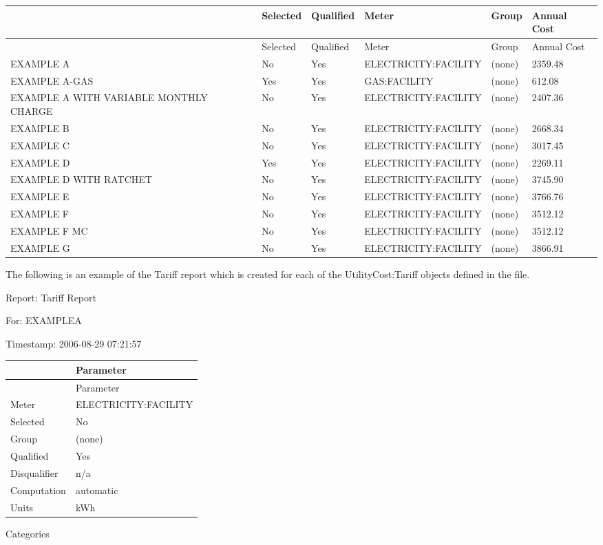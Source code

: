 {\scriptsize
\begin{longtable}[c]{>{\raggedright}p{1.0in}>{\raggedright}p{1.0in}>{\raggedright}p{1.0in}>{\raggedright}p{1.0in}>{\raggedright}p{1.0in}>{\raggedright}p{1.0in}}
\toprule 
~ & Selected & Qualified & Meter & Group & Annual Cost \tabularnewline
\midrule
\endfirsthead

\toprule 
~ & Selected & Qualified & Meter & Group & Annual Cost \tabularnewline
\midrule
\endhead

EXAMPLE A & No & Yes & ELECTRICITY\-:FACILITY & (none) & 2359.48 \tabularnewline
EXAMPLE A-GAS & Yes & Yes & GAS\-:FACILITY & (none) & 612.08 \tabularnewline
EXAMPLE A WITH VARIABLE MONTHLY CHARGE & No & Yes & ELECTRICITY\-:FACILITY & (none) & 2407.36 \tabularnewline
EXAMPLE B & No & Yes & ELECTRICITY\-:FACILITY & (none) & 2668.34 \tabularnewline
EXAMPLE C & No & Yes & ELECTRICITY\-:FACILITY & (none) & 3017.45 \tabularnewline
EXAMPLE D & Yes & Yes & ELECTRICITY\-:FACILITY & (none) & 2269.11 \tabularnewline
EXAMPLE D WITH RATCHET & No & Yes & ELECTRICITY\-:FACILITY & (none) & 3745.90 \tabularnewline
EXAMPLE E & No & Yes & ELECTRICITY\-:FACILITY & (none) & 3766.76 \tabularnewline
EXAMPLE F & No & Yes & ELECTRICITY\-:FACILITY & (none) & 3512.12 \tabularnewline
EXAMPLE F MC & No & Yes & ELECTRICITY\-:FACILITY & (none) & 3512.12 \tabularnewline
EXAMPLE G & No & Yes & ELECTRICITY\-:FACILITY & (none) & 3866.91 \tabularnewline
\bottomrule
\end{longtable}}

The following is an example of the Tariff report which is created for each of the UtilityCost:Tariff objects defined in the file.

Report: Tariff Report

For: EXAMPLEA

Timestamp: 2006-08-29 07:21:57

\begin{longtable}[c]{@{}ll@{}}
\toprule 
~ & Parameter \tabularnewline
\midrule
\endfirsthead

\toprule 
~ & Parameter \tabularnewline
\midrule
\endhead

Meter & ELECTRICITY:FACILITY \tabularnewline
Selected & No \tabularnewline
Group & (none) \tabularnewline
Qualified & Yes \tabularnewline
Disqualifier & n/a \tabularnewline
Computation & automatic \tabularnewline
Units & kWh \tabularnewline
\bottomrule
\end{longtable}

Categories

